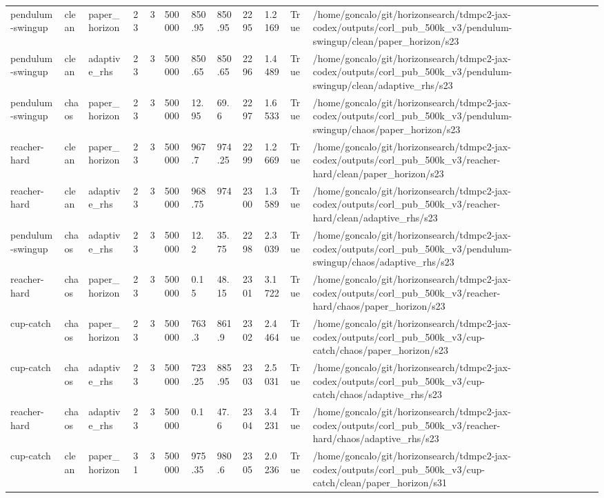 \begin{tabular}{llllllllllll}
pendulum-swingup & clean & paper\_horizon & 23 & 3 & 500000 & 850.95 & 850.95 & 2295 & 1.2169 & True & /home/goncalo/git/horizonsearch/tdmpc2-jax-codex/outputs/corl\_pub\_500k\_v3/pendulum-swingup/clean/paper\_horizon/s23 \\
pendulum-swingup & clean & adaptive\_rhs & 23 & 3 & 500000 & 850.65 & 850.65 & 2296 & 1.4489 & True & /home/goncalo/git/horizonsearch/tdmpc2-jax-codex/outputs/corl\_pub\_500k\_v3/pendulum-swingup/clean/adaptive\_rhs/s23 \\
pendulum-swingup & chaos & paper\_horizon & 23 & 3 & 500000 & 12.95 & 69.6 & 2297 & 1.6533 & True & /home/goncalo/git/horizonsearch/tdmpc2-jax-codex/outputs/corl\_pub\_500k\_v3/pendulum-swingup/chaos/paper\_horizon/s23 \\
reacher-hard & clean & paper\_horizon & 23 & 3 & 500000 & 967.7 & 974.25 & 2299 & 1.2669 & True & /home/goncalo/git/horizonsearch/tdmpc2-jax-codex/outputs/corl\_pub\_500k\_v3/reacher-hard/clean/paper\_horizon/s23 \\
reacher-hard & clean & adaptive\_rhs & 23 & 3 & 500000 & 968.75 & 974 & 2300 & 1.3589 & True & /home/goncalo/git/horizonsearch/tdmpc2-jax-codex/outputs/corl\_pub\_500k\_v3/reacher-hard/clean/adaptive\_rhs/s23 \\
pendulum-swingup & chaos & adaptive\_rhs & 23 & 3 & 500000 & 12.2 & 35.75 & 2298 & 2.3039 & True & /home/goncalo/git/horizonsearch/tdmpc2-jax-codex/outputs/corl\_pub\_500k\_v3/pendulum-swingup/chaos/adaptive\_rhs/s23 \\
reacher-hard & chaos & paper\_horizon & 23 & 3 & 500000 & 0.15 & 48.15 & 2301 & 3.1722 & True & /home/goncalo/git/horizonsearch/tdmpc2-jax-codex/outputs/corl\_pub\_500k\_v3/reacher-hard/chaos/paper\_horizon/s23 \\
cup-catch & chaos & paper\_horizon & 23 & 3 & 500000 & 763.3 & 861.9 & 2302 & 2.4464 & True & /home/goncalo/git/horizonsearch/tdmpc2-jax-codex/outputs/corl\_pub\_500k\_v3/cup-catch/chaos/paper\_horizon/s23 \\
cup-catch & chaos & adaptive\_rhs & 23 & 3 & 500000 & 723.25 & 885.95 & 2303 & 2.5031 & True & /home/goncalo/git/horizonsearch/tdmpc2-jax-codex/outputs/corl\_pub\_500k\_v3/cup-catch/chaos/adaptive\_rhs/s23 \\
reacher-hard & chaos & adaptive\_rhs & 23 & 3 & 500000 & 0.1 & 47.6 & 2304 & 3.4231 & True & /home/goncalo/git/horizonsearch/tdmpc2-jax-codex/outputs/corl\_pub\_500k\_v3/reacher-hard/chaos/adaptive\_rhs/s23 \\
cup-catch & clean & paper\_horizon & 31 & 3 & 500000 & 975.35 & 980.6 & 2305 & 2.0236 & True & /home/goncalo/git/horizonsearch/tdmpc2-jax-codex/outputs/corl\_pub\_500k\_v3/cup-catch/clean/paper\_horizon/s31 \\

\end{tabular}
